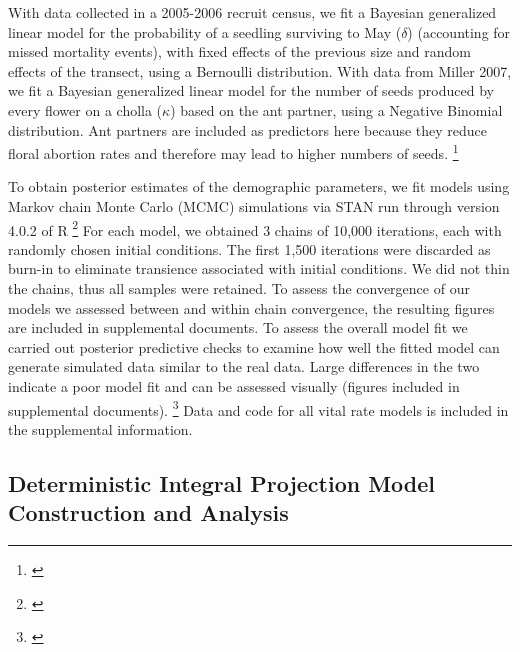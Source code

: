 \documentclass[11pt]{article}
\newcommand{\tom}[2]{{\color{red}{#1}}\footnote{\textit{\color{red}{#2}}}}
\begin{document}
With data collected in a 2005-2006 recruit census, we fit a Bayesian generalized linear model for the probability of a seedling surviving to May ($\delta$) (accounting for missed mortality events), with fixed effects of the previous size and random effects of the transect, using a Bernoulli distribution. 
With data from Miller 2007, we fit a Bayesian generalized linear model for the number of seeds produced by every flower on a cholla ($\kappa$) based on the ant partner, using a Negative Binomial distribution. 
Ant partners are included as predictors here because they reduce floral abortion rates and therefore may lead to higher numbers of seeds. 
\tom{}{General comment here is that each of these models needs to be described in greater detail and shown in reproducible notation. You also need to describe the idea of transitions in size x,y and ant state i,j since this sets the stage for the structure of the IPM.}

To obtain posterior estimates of the demographic parameters, we fit models using Markov chain Monte Carlo (MCMC) simulations via STAN run through version 4.0.2 of R \tom{}{You need to cite R and RStan}
For each model, we obtained 3 chains of 10,000 iterations, each with randomly chosen initial conditions. 
The first 1,500 iterations were discarded as burn-in to eliminate transience associated with initial conditions. 
We did not thin the chains, thus all samples were retained. 
To assess the convergence of our models we assessed between and within chain convergence, the resulting figures are included in supplemental documents. 
To assess the overall model fit we carried out posterior predictive checks to examine how well the fitted model can generate simulated data similar to the real data.
Large differences in the two indicate a poor model fit and can be assessed visually (figures included in supplemental documents). 
\tom{All estimated parameters are described in table 1.}{I think I suggested this years ago but there are so many parameters in your model that I don't think it is particularly useful to report all of these in a table. Including publicly available data and code is good enough.}
Data and code for all vital rate models is included in the supplemental information.

\subsection*{Deterministic Integral Projection Model Construction and Analysis}
  
\end{document}

